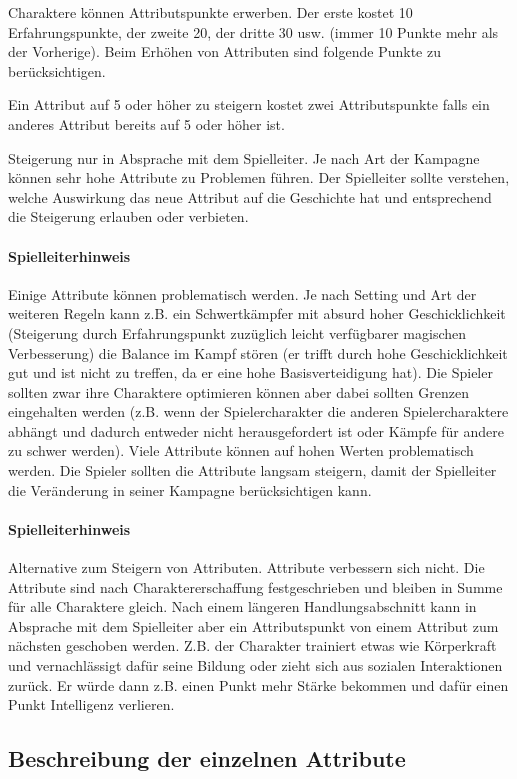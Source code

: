 \documentclass{article}
\begin{document}
Charaktere können Attributspunkte erwerben. Der erste kostet 10 Erfahrungspunkte, der zweite 20, der dritte 30 usw.
(immer 10 Punkte mehr als der Vorherige). Beim Erhöhen von Attributen sind folgende Punkte zu berücksichtigen.

Ein Attribut auf 5 oder höher zu steigern kostet zwei Attributspunkte falls ein anderes Attribut bereits auf 5
oder höher ist.

Steigerung nur in Absprache mit dem Spielleiter. Je nach Art der Kampagne können sehr hohe Attribute zu Problemen
führen. Der Spielleiter sollte verstehen, welche Auswirkung das neue Attribut auf die Geschichte hat und entsprechend
die Steigerung erlauben oder verbieten.

\begin{mdframed}[hidealllines=true, backgroundcolor=black!10]
\paragraph{Spielleiterhinweis}

Einige Attribute können problematisch werden. Je nach Setting und Art der weiteren Regeln kann z.B. ein
Schwertkämpfer mit absurd hoher Geschicklichkeit (Steigerung durch Erfahrungspunkt zuzüglich leicht verfügbarer
magischen Verbesserung) die Balance im Kampf stören (er trifft durch hohe Geschicklichkeit gut und ist nicht zu
treffen, da er eine hohe Basisverteidigung hat). Die Spieler sollten zwar ihre Charaktere optimieren können aber
dabei sollten Grenzen eingehalten werden (z.B. wenn der Spielercharakter die anderen Spielercharaktere abhängt und
dadurch entweder nicht herausgefordert ist oder Kämpfe für andere zu schwer werden). Viele Attribute können auf
hohen Werten problematisch werden. Die Spieler sollten die Attribute langsam steigern, damit der Spielleiter die
Veränderung in seiner Kampagne berücksichtigen kann.

\end{mdframed}
\begin{mdframed}[hidealllines=true, backgroundcolor=black!10]
\paragraph{Spielleiterhinweis}

Alternative zum Steigern von Attributen. Attribute verbessern sich nicht.
Die Attribute sind nach Charaktererschaffung festgeschrieben und bleiben in Summe für alle Charaktere gleich.
Nach einem längeren Handlungsabschnitt kann in Absprache mit dem Spielleiter aber ein Attributspunkt von einem
Attribut zum nächsten geschoben werden. Z.B. der Charakter trainiert etwas wie Körperkraft und vernachlässigt dafür
seine Bildung oder zieht sich aus sozialen Interaktionen zurück. Er würde dann z.B. einen Punkt mehr Stärke bekommen
und dafür einen Punkt Intelligenz verlieren.

\end{mdframed}
\begin{center}
\subsection{Beschreibung der einzelnen Attribute}
\end{center}
\end{document}
